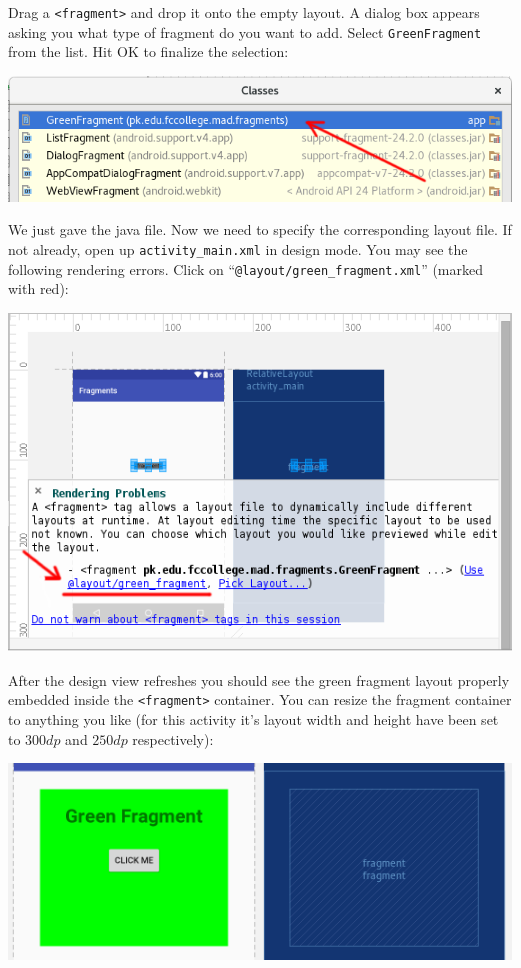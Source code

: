 Drag a \texttt{<fragment>} and drop it onto the empty layout. A dialog box appears asking you what type of fragment do you want to add. Select \texttt{GreenFragment} from the list. Hit OK to finalize the selection:

\begin{center}
	\includegraphics[scale=\SourceCodeScale]{chapters/ch11/images/10}
\end{center}

We just gave the java file. Now we need to specify the corresponding layout file. If not already, open up \texttt{activity\_main.xml} in design mode. You may see the following rendering errors. Click on ``\texttt{@layout/green\_fragment.xml}'' (marked with red):

\begin{center}
	\includegraphics[scale=\FigureScale]{chapters/ch11/images/11}
\end{center}

After the design view refreshes you should see the green fragment layout properly embedded inside the \texttt{<fragment>} container. You can resize the fragment container to anything you like (for this activity it's layout width and height have been set to $300dp$ and $250dp$ respectively):

\begin{center}
	\includegraphics[scale=\FigureScale]{chapters/ch11/images/12}
\end{center}

